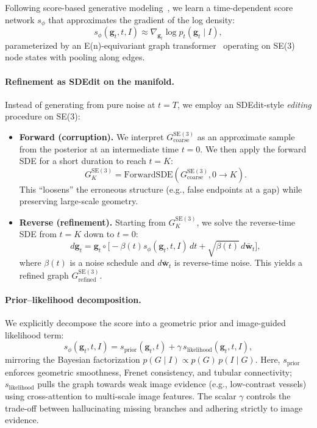 \documentclass{article}
\newcommand{\SE}[1]{\mathrm{SE}(#1)}
\begin{document}
Following score-based generative modeling~\cite{song2021score}, we learn a time-dependent score network $s_\phi$ that approximates the gradient of the log density:
\begin{equation}
    s_\phi(\mathbf{g}_t, t, I) \approx \nabla_{\mathbf{g}_t} \log p_t(\mathbf{g}_t \mid I),
\end{equation}
parameterized by an E(n)-equivariant graph transformer~\cite{satorras2021n,liao2024equiformer} operating on SE(3) node states with pooling along edges.

\paragraph{Refinement as SDEdit on the manifold.}
Instead of generating from pure noise at $t = T$, we employ an SDEdit-style \emph{editing} procedure on SE(3):

\begin{itemize}
    \item \textbf{Forward (corruption).}
    We interpret $G^{\SE{3}}_{\text{coarse}}$ as an approximate sample from the posterior at an intermediate time $t = 0$. We then apply the forward SDE for a short duration to reach $t = K$:
    \begin{equation}
        G^{\SE{3}}_K = \mathrm{ForwardSDE}(G^{\SE{3}}_{\text{coarse}}, 0 \to K).
    \end{equation}
    This ``loosens'' the erroneous structure (e.g., false endpoints at a gap) while preserving large-scale geometry.
    \item \textbf{Reverse (refinement).}
    Starting from $G^{\SE{3}}_K$, we solve the reverse-time SDE from $t = K$ down to $t = 0$:
    \begin{equation}
        d\mathbf{g}_t = \mathbf{g}_t \circ \big[-\beta(t) s_\phi(\mathbf{g}_t, t, I)\, dt + \sqrt{\beta(t)}\, d\bar{\mathbf{w}}_t\big],
    \end{equation}
    where $\beta(t)$ is a noise schedule and $d\bar{\mathbf{w}}_t$ is reverse-time noise. This yields a refined graph $G^{\SE{3}}_{\text{refined}}$.
\end{itemize}

\paragraph{Prior--likelihood decomposition.}
We explicitly decompose the score into a geometric prior and image-guided likelihood term:
\begin{equation}
    s_\phi(\mathbf{g}_t, t, I) 
    = s_{\text{prior}}(\mathbf{g}_t, t) 
    + \gamma\, s_{\text{likelihood}}(\mathbf{g}_t, t, I),
\end{equation}
mirroring the Bayesian factorization $p(G \mid I) \propto p(G)\,p(I \mid G)$. Here, $s_{\text{prior}}$ enforces geometric smoothness, Frenet consistency, and tubular connectivity; $s_{\text{likelihood}}$ pulls the graph towards weak image evidence (e.g., low-contrast vessels) using cross-attention to multi-scale image features. The scalar $\gamma$ controls the trade-off between hallucinating missing branches and adhering strictly to image evidence.
\end{document}

